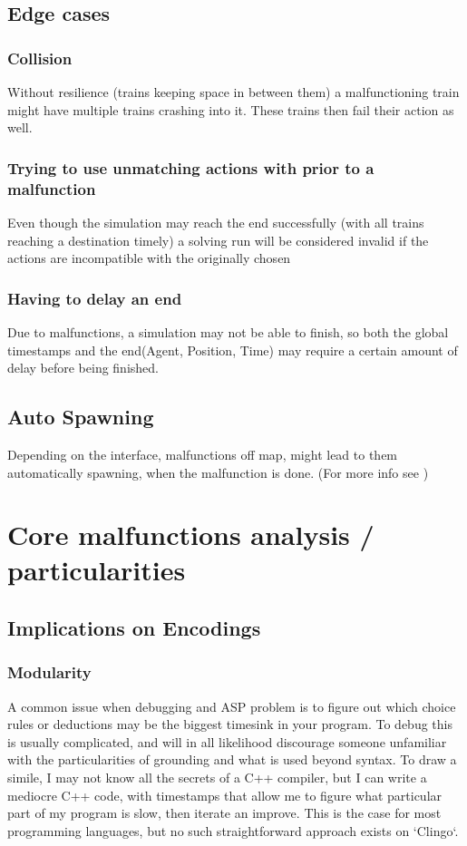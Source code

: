 \subsection{Edge cases}

\subsubsection {Collision} Without resilience (trains keeping space in between them) a malfunctioning train might have multiple trains crashing into it. These trains then fail their action as well.

\subsubsection {Trying to use unmatching actions with prior to a malfunction} Even though the simulation may reach the end successfully (with all trains reaching a destination timely) a solving run will be considered invalid if the actions are incompatible with the originally chosen

\subsubsection {Having to delay an end} Due to malfunctions, a simulation may not be able to finish, so both the global timestamps and the end(Agent, Position, Time) may require a certain amount of delay before being finished.

\subsection {Auto Spawning} Depending on the interface, malfunctions off map, might lead to them automatically spawning, when the malfunction is done. (For more info see \cite{malfunction_issue})

\section{Core malfunctions analysis / particularities}
\subsection{Implications on Encodings}

\subsubsection{Modularity}
A common issue when debugging and ASP problem is to figure out which choice rules or deductions may be the biggest timesink in your program. To debug this is usually complicated, and will in all likelihood discourage someone unfamiliar with the particularities of grounding and what is used beyond syntax. To draw a simile, I may not know all the secrets of a C++ compiler, but I can write a mediocre C++ code, with timestamps that allow me to figure what particular part of my program is slow, then iterate an improve. This is the case for most programming languages, but no such straightforward approach exists on `Clingo`.

